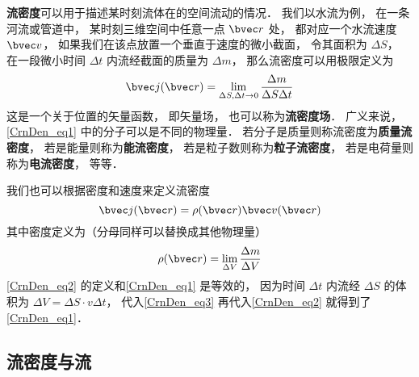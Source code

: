 

\textbf{流密度}可以用于描述某时刻流体在的空间流动的情况． 我们以水流为例， 在一条河流或管道中， 某时刻三维空间中任意一点 $\bvec r$ 处， 都对应一个水流速度 $\bvec v$， 如果我们在该点放置一个垂直于速度的微小截面， 令其面积为 $\Delta S$， 在一段微小时间 $\Delta t$ 内流经截面的质量为 $\Delta m$， 那么流密度可以用极限定义为
\begin{equation}\label{CrnDen_eq1}
\bvec j(\bvec r) = \lim_{\Delta S, \Delta t \to 0} \frac{\Delta m}{\Delta S \Delta t}
\end{equation}
这是一个关于位置的矢量函数， 即矢量场， 也可以称为\textbf{流密度场}． 广义来说， \autoref{CrnDen_eq1} 中的分子可以是不同的物理量． 若分子是质量则称流密度为\textbf{质量流密度}， 若是能量则称为\textbf{能流密度}， 若是粒子数则称为\textbf{粒子流密度}， 若是电荷量则称为\textbf{电流密度}， 等等． 

我们也可以根据密度和速度来定义流密度
\begin{equation}\label{CrnDen_eq2}
\bvec j(\bvec r) = \rho(\bvec r) \bvec v(\bvec r)
\end{equation}
其中密度定义为（分母同样可以替换成其他物理量）
\begin{equation}\label{CrnDen_eq3}
\rho(\bvec r) = \lim_{\Delta V} \frac{\Delta m}{\Delta V}
\end{equation}
\autoref{CrnDen_eq2} 的定义和\autoref{CrnDen_eq1} 是等效的， 因为时间 $\Delta t$ 内流经 $\Delta S$ 的体积为 $\Delta V = \Delta S \cdot v  \Delta t$， 代入\autoref{CrnDen_eq3} 再代入\autoref{CrnDen_eq2} 就得到了\autoref{CrnDen_eq1}．

\subsection{流密度与流}
